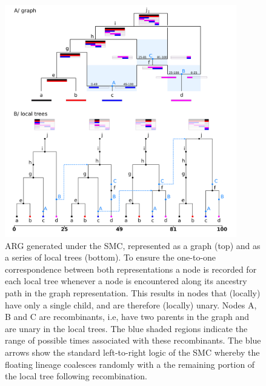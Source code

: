 \documentclass{article}
\begin{document}
\begin{figure}
\centering
\includegraphics[width=0.9\textwidth]{figures/smc_custom_2rows_area_full_hap.png}
\caption{ARG generated under the SMC, represented as a graph (top) and as a
series of local trees (bottom). To ensure the one-to-one correspondence
between both representations a node is recorded for each local tree whenever
a node is encountered along its ancestry path in the graph representation.
This results in nodes that (locally) have only a single child, and are therefore
(locally) unary. 
Nodes A, B and C are recombinants, i.e, have two parents in the graph
and are unary in the local trees. The blue shaded regions indicate
the range of possible times associated with these recombinants.
The blue arrows show the
standard left-to-right logic of the SMC whereby
the floating lineage coalesces randomly
with a the remaining portion of the local tree following recombination.
}
\label{fig:smc-unary}
\end{figure}
\end{document}
